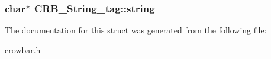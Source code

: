 \subsubsection[{string}]{\setlength{\rightskip}{0pt plus 5cm}char$\ast$ C\+R\+B\+\_\+\+String\+\_\+tag\+::string}\label{struct_c_r_b___string__tag_a797e7b2d75e0c612d1a1a956d2ffd5ad}


The documentation for this struct was generated from the following file\+:\begin{DoxyCompactItemize}
\item 
\hyperlink{crowbar_8h}{crowbar.\+h}\end{DoxyCompactItemize}
